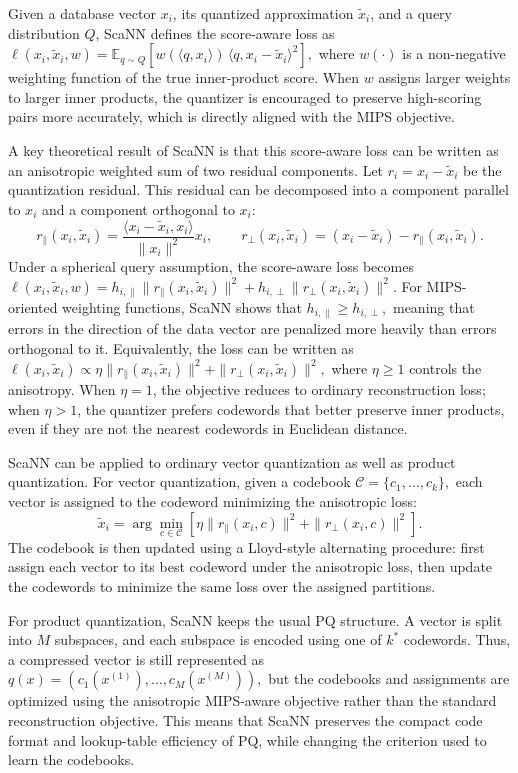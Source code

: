 \documentclass[sigconf]{acmart}
\begin{document}
Given a database vector $x_i$, its quantized approximation $\tilde{x}_i$, and a query distribution $Q$, ScaNN defines the score-aware loss as
\(
\ell(x_i,\tilde{x}_i,w)
=
\mathbb{E}_{q\sim Q}
\left[
w(\langle q,x_i\rangle)
\,
\langle q,x_i-\tilde{x}_i\rangle^2
\right],
\)
where $w(\cdot)$ is a non-negative weighting function of the true inner-product score. 
When $w$ assigns larger weights to larger inner products, the quantizer is encouraged to preserve high-scoring pairs more accurately, which is directly aligned with the MIPS objective.

A key theoretical result of ScaNN is that this score-aware loss can be written as an anisotropic weighted sum of two residual components. 
Let
\(
r_i = x_i-\tilde{x}_i
\)
be the quantization residual. 
This residual can be decomposed into a component parallel to $x_i$ and a component orthogonal to $x_i$:
\[
r_{\parallel}(x_i,\tilde{x}_i)
=
\frac{\langle x_i-\tilde{x}_i,x_i\rangle}{\|x_i\|^2}x_i,
\qquad
r_{\perp}(x_i,\tilde{x}_i)
=
(x_i-\tilde{x}_i)-r_{\parallel}(x_i,\tilde{x}_i).
\]
Under a spherical query assumption, the score-aware loss becomes
\(
\ell(x_i,\tilde{x}_i,w)
=
h_{i,\parallel}
\|r_{\parallel}(x_i,\tilde{x}_i)\|^2
+
h_{i,\perp}
\|r_{\perp}(x_i,\tilde{x}_i)\|^2 .
\)
For MIPS-oriented weighting functions, ScaNN shows that
\(
h_{i,\parallel} \ge h_{i,\perp},
\)
meaning that errors in the direction of the data vector are penalized more heavily than errors orthogonal to it. 
Equivalently, the loss can be written as
\(
\ell(x_i,\tilde{x}_i)
\propto
\eta
\|r_{\parallel}(x_i,\tilde{x}_i)\|^2
+
\|r_{\perp}(x_i,\tilde{x}_i)\|^2,
\)
where $\eta \ge 1$ controls the anisotropy. 
When $\eta=1$, the objective reduces to ordinary reconstruction loss; when $\eta>1$, the quantizer prefers codewords that better preserve inner products, even if they are not the nearest codewords in Euclidean distance.

ScaNN can be applied to ordinary vector quantization as well as product quantization. 
For vector quantization, given a codebook
\(
\mathcal{C}=\{c_1,\ldots,c_k\},
\)
each vector is assigned to the codeword minimizing the anisotropic loss:
\[
\tilde{x}_i
=
\arg\min_{c\in \mathcal{C}}
\left[
\eta
\|r_{\parallel}(x_i,c)\|^2
+
\|r_{\perp}(x_i,c)\|^2
\right].
\]
The codebook is then updated using a Lloyd-style alternating procedure: first assign each vector to its best codeword under the anisotropic loss, then update the codewords to minimize the same loss over the assigned partitions.

For product quantization, ScaNN keeps the usual PQ structure. 
A vector is split into $M$ subspaces, and each subspace is encoded using one of $k^{*}$ codewords. 
Thus, a compressed vector is still represented as
\(
q(x)
=
\left(
c_1(x^{(1)}),
\ldots,
c_M(x^{(M)})
\right),
\)
but the codebooks and assignments are optimized using the anisotropic MIPS-aware objective rather than the standard reconstruction objective. 
This means that ScaNN preserves the compact code format and lookup-table efficiency of PQ, while changing the criterion used to learn the codebooks.
\end{document}
